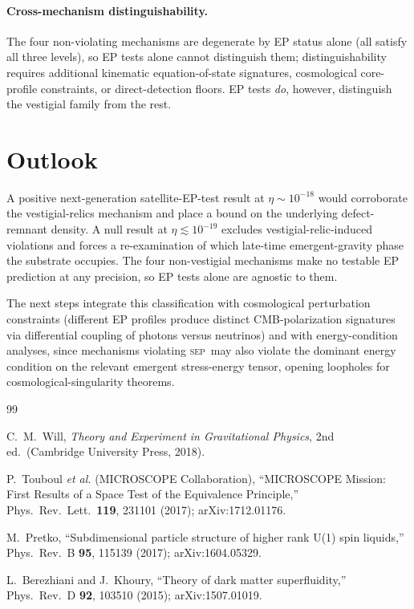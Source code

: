 \documentclass[twocolumn]{revtex4-2}
\newcommand{\SEP}{\textsc{sep}}
\begin{document}
\paragraph*{Cross-mechanism distinguishability.}
The four non-violating mechanisms are degenerate by EP status alone
(all satisfy all three levels), so EP tests alone cannot distinguish
them; distinguishability requires additional kinematic
equation-of-state signatures, cosmological core-profile constraints,
or direct-detection floors. EP tests \emph{do}, however, distinguish
the vestigial family from the rest.

\section{Outlook}
\label{sec:outlook}

A positive next-generation satellite-EP-test result at
$\eta \sim 10^{-18}$ would corroborate the vestigial-relics mechanism
and place a bound on the underlying defect-remnant density. A null
result at $\eta \lesssim 10^{-19}$ excludes vestigial-relic-induced
violations and forces a re-examination of which late-time
emergent-gravity phase the substrate occupies. The four non-vestigial
mechanisms make no testable EP prediction at any precision, so EP
tests alone are agnostic to them.

The next steps integrate this classification with cosmological
perturbation constraints (different EP profiles produce distinct
CMB-polarization signatures via differential coupling of photons
versus neutrinos) and with energy-condition analyses, since
mechanisms violating \SEP\ may also violate the dominant energy
condition on the relevant emergent stress-energy tensor, opening
loopholes for cosmological-singularity theorems.

\begin{thebibliography}{99}

C.~M.~Will,
\emph{Theory and Experiment in Gravitational Physics}, 2nd ed.\
(Cambridge University Press, 2018).

P.~Touboul \emph{et al.\/} (MICROSCOPE Collaboration),
``MICROSCOPE Mission: First Results of a Space Test of the Equivalence
Principle,''
Phys.\ Rev.\ Lett.\ \textbf{119}, 231101 (2017); arXiv:1712.01176.

M.~Pretko,
``Subdimensional particle structure of higher rank U(1) spin liquids,''
Phys.\ Rev.\ B \textbf{95}, 115139 (2017); arXiv:1604.05329.

L.~Berezhiani and J.~Khoury,
``Theory of dark matter superfluidity,''
Phys.\ Rev.\ D \textbf{92}, 103510 (2015); arXiv:1507.01019.

\end{thebibliography}
\end{document}
